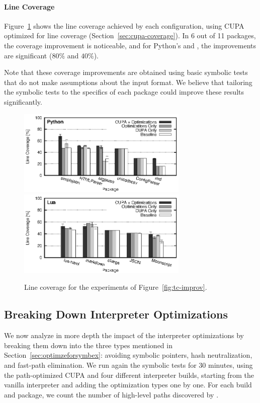 \paragraph{Line Coverage}

Figure~\ref{fig:coverage-improv} shows the line coverage achieved by each configuration, using CUPA optimized for line coverage (Section~\ref{sec:cupa-coverage}).  In 6 out of 11 packages, the coverage improvement is noticeable, and for Python's  and , the improvements are significant ($80\%$ and $40\%$).

Note that these coverage improvements are obtained using basic symbolic tests that do not make assumptions about the input format.  We believe that tailoring the symbolic tests to the specifics of each package could improve these results significantly.

\begin{figure}[t]
  \centering
  \includegraphics[width=3.2in]{figures/evaluation/bkdown-stmtcov-python} \\
  \includegraphics[width=3.2in]{figures/evaluation/bkdown-stmtcov-lua}
  \caption{Line coverage for the experiments of Figure~\ref{fig:tc-improv}.}
  \label{fig:coverage-improv}
\end{figure}

\subsection{Breaking Down Interpreter Optimizations}
\label{sec:sub:optimizations}

We now analyze in more depth the impact of the interpreter optimizations by breaking them down into the three types mentioned in Section~\ref{sec:optimzeforsymbex}: avoiding symbolic pointers, hash neutralization, and fast-path elimination.  We run again the symbolic tests for 30 minutes, using the path-optimized CUPA and four different interpreter builds, starting from the vanilla interpreter and adding the optimization types one by one.  For each build and package, we count the number of high-level paths discovered by \chef.

